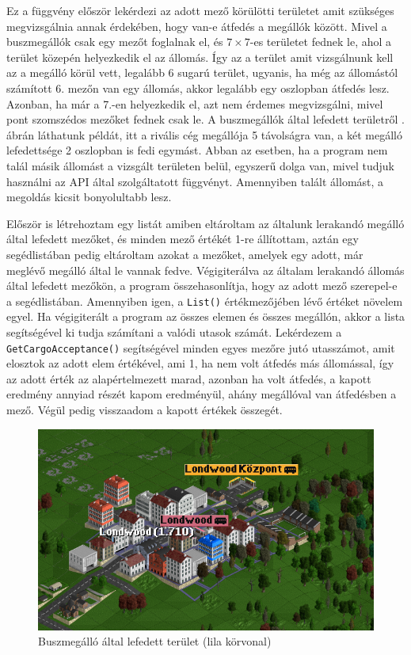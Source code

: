 Ez a függvény először lekérdezi az adott mező körülötti területet amit szükséges megvizsgálnia annak érdekében, hogy van-e átfedés a megállók között. Mivel a buszmegállók csak egy mezőt foglalnak el, és $7 \times 7$-es területet fednek le, ahol a terület közepén helyezkedik el az állomás. Így az a terület amit vizsgálnunk kell az a megálló körül vett, legalább 6 sugarú terület, ugyanis, ha még az állomástól számított 6. mezőn van egy állomás, akkor legalább egy oszlopban átfedés lesz. Azonban, ha már a 7.-en helyezkedik el, azt nem érdemes megvizsgálni, mivel pont szomszédos mezőket fednek csak le. A buszmegállók által lefedett területről . ábrán láthatunk példát, itt a rivális cég megállója 5 távolságra van, a két megálló lefedettsége 2 oszlopban is fedi egymást. Abban az esetben, ha a program nem talál másik állomást a vizsgált területen belül, egyszerű dolga van, mivel tudjuk használni az API által szolgáltatott függvényt. Amennyiben talált állomást, a megoldás kicsit bonyolultabb lesz.

Először is létrehoztam egy listát amiben eltároltam az általunk lerakandó megálló által lefedett mezőket, és minden mező értékét 1-re állítottam, aztán egy segédlistában pedig eltároltam azokat a mezőket, amelyek egy adott, már meglévő megálló által le vannak fedve. Végigiterálva az általam lerakandó állomás által lefedett mezőkön, a program összehasonlítja, hogy az adott mező szerepel-e a segédlistában. Amennyiben igen, a \texttt{List()} értékmezőjében lévő értéket növelem egyel. Ha végigiterált a program az összes elemen és összes megállón, akkor a lista segítségével ki tudja számítani a valódi utasok számát. Lekérdezem a \texttt{GetCargoAcceptance()} segítségével minden egyes mezőre jutó utasszámot, amit elosztok az adott elem értékével, ami 1, ha nem volt átfedés más állomással, így az adott érték az alapértelmezett marad, azonban ha volt átfedés, a kapott eredmény annyiad részét kapom eredményül, ahány megállóval van átfedésben a mező. Végül pedig visszaadom a kapott értékek összegét.

\begin{figure} [b!]
	\centering
	\includegraphics[width=\textwidth]{images/megallo.png}
	\caption{Buszmegálló által lefedett terület (lila körvonal)}
	\label{fig:megallo}
\end{figure}

